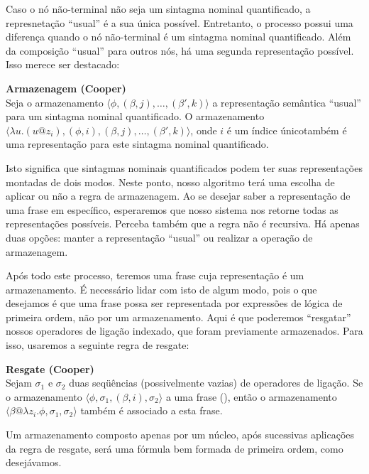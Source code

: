 Caso o nó não-terminal não seja um sintagma nominal quantificado, a represnetação ``usual'' é a sua única possível. Entretanto, o processo possui uma diferença quando o nó não-terminal é um sintagma nominal quantificado. Além da composição ``usual'' para outros nós, há uma segunda representação possível. Isso merece ser destacado:

\begin{oframed}\textbf{Armazenagem (Cooper)}\\
Seja o armazenamento $\langle\phi, (\beta, j), \dots, (\beta', k)\rangle$ a representação semântica ``usual'' para um sintagma nominal quantificado. O armazenamento $\langle\lambda u.(u@z_i), (\phi, i), (\beta, j), \dots, (\beta', k)\rangle $, onde $i$ é um índice único\footnotemark também é uma representação para este sintagma nominal quantificado.
\end{oframed}

Isto significa que sintagmas nominais quantificados podem ter suas representações montadas de dois modos. Neste ponto, nosso algoritmo terá uma escolha de aplicar ou não a regra de armazenagem. Ao se desejar saber a representação de uma frase em específico, esperaremos que nosso sistema nos retorne todas as representações possíveis. Perceba também que a regra não é recursiva. Há apenas duas opções: manter a representação ``usual'' ou realizar a operação de armazenagem.

Após todo este processo, teremos uma frase cuja representação é um armazenamento. É necessário lidar com isto de algum modo, pois o que desejamos é que uma frase possa ser representada por expressões de lógica de primeira ordem, não por um armazenamento. Aqui é que poderemos ``resgatar'' nossos operadores de ligação indexado, que foram previamente armazenados. Para isso, usaremos a seguinte regra de resgate:

\begin{oframed} \textbf{Resgate (Cooper)}\\
Sejam $\sigma_1$ e $\sigma_2$ duas seqüências (possivelmente vazias) de operadores de ligação. Se o armazenamento $\langle\phi, \sigma_1, (\beta, i), \sigma_2\rangle$ a uma frase (), então o armazenamento $\langle\beta @ \lambda z_i . \phi , \sigma_1, \sigma_2 \rangle$ também é associado a esta frase.
\end{oframed}

Um armazenamento composto apenas por um núcleo, após sucessivas aplicações da regra de resgate, será uma fórmula bem formada de primeira ordem, como desejávamos.

